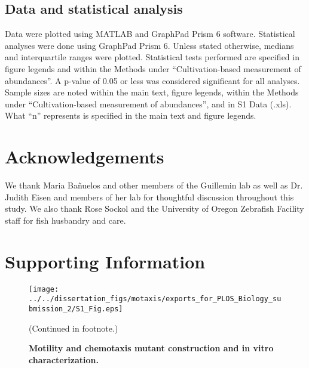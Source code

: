 {{{{{{{\subsection{Data and statistical analysis}

Data were plotted using MATLAB and GraphPad Prism 6 software. Statistical analyses were done using GraphPad Prism 6. Unless stated otherwise, medians and interquartile ranges were plotted. Statistical tests performed are specified in figure legends and within the Methods under ``Cultivation-based measurement of abundances''. A p-value of 0.05 or less was considered significant for all analyses. Sample sizes are noted within the main text, figure legends, within the Methods under ``Cultivation-based measurement of abundances'', and in S1 Data (.xls). What ``n'' represents is specified in the main text and figure legends. 

\section{Acknowledgements}
We thank Maria Bañuelos and other members of the Guillemin lab as well as Dr. Judith Eisen and members of her lab for thoughtful discussion throughout this study. We also thank Rose Sockol and the University of Oregon Zebrafish Facility staff for fish husbandry and care.


\newpage
\section{Supporting Information}

\renewcommand\thefigure{S\arabic{figure}}    
\begin{figure}%
	\centerline{
		\texttt{[image: ../../dissertation\_figs/motaxis/exports\_for\_PLOS\_Biology\_submission\_2/S1\_Fig.eps]}}
	\caption{\textbf{Motility and chemotaxis mutant construction and in vitro characterization.}}{(Continued in footnote.)}
	\label{fig:motaxis_figS1}
\end{figure}

}}}}}}}
